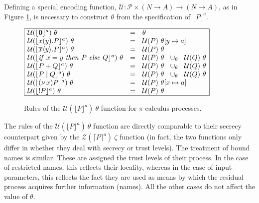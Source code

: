 \documentclass[10pt,a4paper,final,oneside,fleqn]{book}
\begin{document}
Defining a special encoding function, $\mathcal{U}:\mathcal{P}\times( N\to A)\to( N\to A)$, as in Figure \ref{theta}, is necessary to construct $\theta$ from the specification of $\lfloor P\rfloor^a$.
\begin{figure}[bht]
\begin{center}
$\begin{array}{|lll|}
\hline
\mathcal{U}(\lfloor {\bf 0}\rfloor^a)~\theta&=&\theta\\
\mathcal{U}(\lfloor x(y).P\rfloor^a)~\theta&=&\mathcal{U}(P)~\theta[y\mapsto a]\\
\mathcal{U}(\lfloor \overline{x}\langle y\rangle.P\rfloor^a)~\theta&=&\mathcal{U}(P)~\theta\\
\mathcal{U}(\lfloor \mbox{{\itshape if\/} }x=y\mbox{ {\itshape then\/} }P\mbox{ {\itshape else\/} }Q\rfloor^a)~\theta&=&\mathcal{U}(P)~\theta~~\cup_\theta~~\mathcal{U}(Q)~\theta\\
\mathcal{U}(\lfloor P+Q\rfloor^a)~\theta&=&\mathcal{U}(P)~\theta~~\cup_\theta~~\mathcal{U}(Q)~\theta\\
\mathcal{U}(\lfloor P\mid Q\rfloor^a)~\theta&=&\mathcal{U}(P)~\theta~~\cup_\theta~~\mathcal{U}(Q)~\theta\\
\mathcal{U}(\lfloor (\nu~\!x)P\rfloor^a)~\theta&=&\mathcal{U}(P)~\theta[x\mapsto a]\\
\mathcal{U}(\lfloor !P\rfloor^a)~\theta&=&\mathcal{U}(P)~\theta\\
\hline
\end{array}$
\end{center}
\caption{Rules of the $\mathcal{U}(\lfloor P\rfloor^a)~\theta$ function for $\pi$-calculus processes.\label{theta}}
\end{figure}
The rules of the $\mathcal{U}(\lfloor P\rfloor^a)~\theta$ function are directly comparable to their secrecy counterpart given by the $\mathcal{Z}(\lceil P\rceil^a)~\zeta$ function (in fact, the two functions only differ in whether they deal with secrecy or trust levels). The treatment of bound names is similar.  These are assigned the trust levels of their process.  In the case of restricted names, this reflects their locality, whereas in the case of input parameters, this reflects the fact they are used as means by which the residual process acquires further information (names).  All the other cases do not affect the value of $\theta$.
\end{document}
